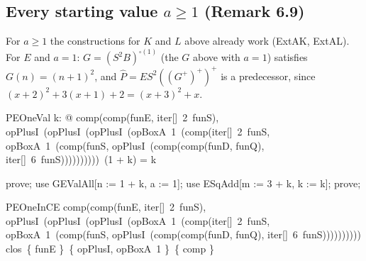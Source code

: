 \documentclass{article}
\begin{document}
\subsection{Every starting value $a \geq 1$ (Remark 6.9)}

For $a \geq 1$ the constructions for $K$ and $L$ above already work (\textsf{ExtAK}, \textsf{ExtAL}).
For $E$ and $a = 1$: $G = (S^2 B)^{\square(1)}$ (the $G$ above with $a = 1$) satisfies $G(n) = (n+1)^2$,
and $\hat P = E S^2 ((G^+)^+)^+$ is a predecessor, since $(x+2)^2 + 3(x+1) + 2 = (x+3)^2 + x$.

\begin{theorem}{PEOneVal}
  \forall k: \nat @ comp(comp(funE, iter[\nat]~2~funS), opPlusI~(opPlusI~(opPlusI~(opBoxA~1~(comp(iter[\nat]~2~funS, opBoxA~1~(comp(funS, opPlusI~(comp(comp(funD, funQ), iter[\nat]~6~funS))))))))))~(1 + k) = k
\end{theorem}

\begin{zproof}
prove;
use GEValAll[n := 1 + k, a := 1];
use ESqAdd[m := 3 + k, k := k];
prove;
\end{zproof}

\begin{theorem}{PEOneInCE}
  comp(comp(funE, iter[\nat]~2~funS), opPlusI~(opPlusI~(opPlusI~(opBoxA~1~(comp(iter[\nat]~2~funS, opBoxA~1~(comp(funS, opPlusI~(comp(comp(funD, funQ), iter[\nat]~6~funS)))))))))) \in clos~\{ funE \}~\{ opPlusI, opBoxA~1 \}~\{ comp \}
\end{theorem}
\end{document}
